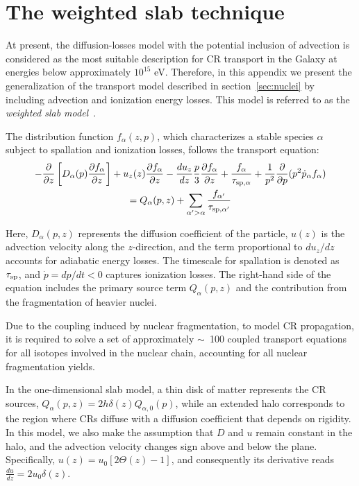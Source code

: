 \section{The weighted slab technique}
\label{app:wsbla}

At present, the diffusion-losses model with the potential inclusion of advection is considered as the most suitable description for CR transport in the Galaxy at energies below approximately $10^{15}$ eV. Therefore, in this appendix we present the generalization of the transport model described in section~\ref{sec:nuclei} by including advection and ionization energy losses. 
%
This model is referred to as the \emph{weighted slab model}~\cite{Ptuskin1996apj,Jones2001apj}.

The distribution function $f_\alpha(z, p)$, which characterizes a stable species $\alpha$ subject to spallation and ionization losses, follows the transport equation:
%
\begin{multline}
-\frac{\partial}{\partial z} \left[ D_{\alpha}(p) \frac{\partial f_\alpha}{\partial z} \right]
+ u_z(z) \frac{\partial f_\alpha}{\partial z}
- \frac{du_z}{dz} \frac{p}{3} \frac{\partial f_\alpha}{\partial z}
+ \frac{f_\alpha}{\tau_{\rm sp,\alpha}}
+ \frac{1}{p^2} \frac{\partial}{\partial p}(p^2 \dot{p}_\alpha f_\alpha ) \\
= Q_\alpha(p,z) + \sum_{\alpha'>\alpha} \frac{f_{\alpha'}}{\tau_{\rm sp, \alpha'}}
\label{eq:fulltransport}
\end{multline}

Here, $D_\alpha(p, z)$ represents the diffusion coefficient of the particle, $u(z)$ is the advection velocity along the $z$-direction, and the term proportional to $du_z/dz$ accounts for adiabatic energy losses. The timescale for spallation is denoted as $\tau_{\rm sp}$, and $\dot{p} = dp/dt < 0$ captures ionization losses. The right-hand side of the equation includes the primary source term $Q_\alpha(p,z)$ and the contribution from the fragmentation of heavier nuclei.

Due to the coupling induced by nuclear fragmentation, to model CR propagation, it is required to solve a set of approximately $\sim$~100 coupled transport equations for all isotopes involved in the nuclear chain, accounting for all nuclear fragmentation yields.

In the one-dimensional slab model, a thin disk of matter represents the CR sources, $Q_\alpha(p,z) = 2 h \delta(z) Q_{\alpha, 0}(p)$, while an extended halo corresponds to the region where CRs diffuse with a diffusion coefficient that depends on rigidity.
%
In this model, we also make the assumption that $D$ and $u$ remain constant in the halo, and the advection velocity changes sign above and below the plane. Specifically, $u(z) = u_0 \left[2\Theta(z)-1\right]$, and consequently its derivative reads $\frac{du}{dz} = 2 u_0 \delta(z)$.

